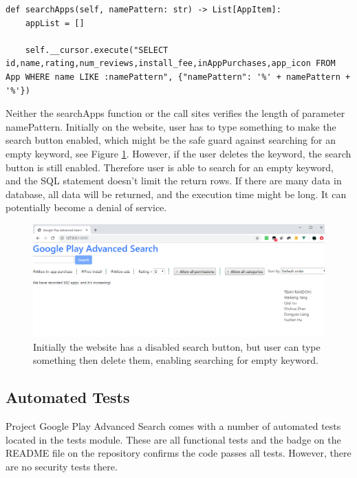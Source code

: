 \documentclass[12pt, a4paper]{article}
\begin{document}
\begin{lstlisting}[frame=tb, caption=DBUtils.AppAccessor.searchApps(), label=lst:searchApps]
def searchApps(self, namePattern: str) -> List[AppItem]:
	appList = []

	self.__cursor.execute("SELECT id,name,rating,num_reviews,install_fee,inAppPurchases,app_icon FROM App WHERE name LIKE :namePattern", {"namePattern": '%' + namePattern + '%'})
\end{lstlisting}

Neither the searchApps function or the call sites verifies the length of parameter namePattern. Initially on the website, user has to type something to make the search button enabled, which might be the safe guard against searching for an empty keyword, see Figure \ref{fig:website-gray-buton}. However, if the user deletes the keyword, the search button is still enabled. Therefore user is able to search for an empty keyword, and the SQL statement doesn't limit the return rows. If there are many data in database, all data will be returned, and the execution time might be long. It can potentially become a denial of service.


\begin{figure}[ht]
\centering
\includegraphics[width=\textwidth]{website-gray-button.png}
\caption{Initially the website has a disabled search button, but user can type something then delete them, enabling searching for empty keyword.}
\label{fig:website-gray-buton}
\end{figure}

\subsection{Automated Tests}
Project Google Play Advanced Search comes with a number of automated tests located in the tests module. These are all functional tests and the badge on the README file on the repository confirms the code passes all tests. However, there are no security tests there.
\end{document}
